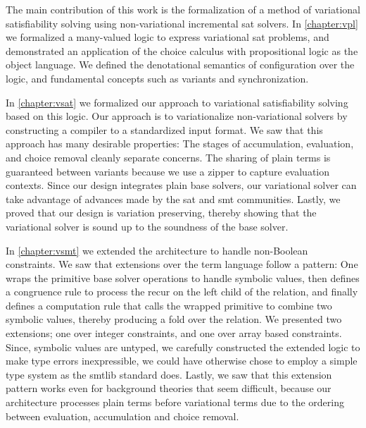 \label{section:conclusion:cont-summary}

The main contribution of this work is the formalization of a method of
variational satisfiability solving using non-variational incremental \ac{sat}
solvers.
%
In \autoref{chapter:vpl} we formalized a many-valued logic to express
variational \ac{sat} problems, and demonstrated an application of the choice
calculus with propositional logic as the object language. We defined the
denotational semantics of configuration over the logic, and fundamental concepts
such as variants and synchronization.

In \autoref{chapter:vsat} we formalized our approach to variational
satisfiability solving based on this logic. Our approach is to variationalize
non-variational solvers by constructing a compiler to a standardized input
format. We saw that this approach has many desirable properties: The stages of
accumulation, evaluation, and choice removal cleanly separate concerns. The
sharing of plain terms is guaranteed between variants because we use a zipper to
capture evaluation contexts. Since our design integrates plain base solvers, our
variational solver can take advantage of advances made by the \ac{sat} and
\ac{smt} communities. Lastly, we proved that our design is variation preserving,
thereby showing that the variational solver is sound up to the soundness of the
base solver.

In \autoref{chapter:vsmt} we extended the architecture to handle non-Boolean
constraints. We saw that extensions over the term language follow a pattern: One
wraps the primitive base solver operations to handle symbolic values, then
defines a congruence rule to process the recur on the left child of the
relation, and finally defines a computation rule that calls the wrapped
primitive to combine two symbolic values, thereby producing a fold over the
relation. We presented two extensions; one over integer constraints, and one
over array based constraints. Since, symbolic values are untyped, we carefully
constructed the extended logic to make type errors inexpressible, we could have
otherwise chose to employ a simple type system as the \acl{smtlib} standard
does. Lastly, we saw that this extension pattern works even for background
theories that seem difficult, because our architecture processes plain terms
before variational terms due to the ordering between evaluation, accumulation
and choice removal.


